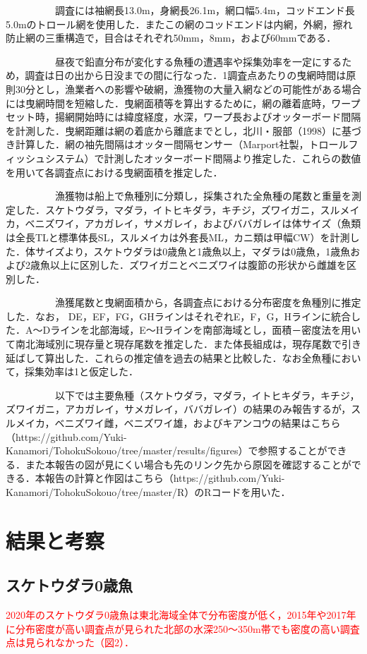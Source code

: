 \documentclass[11pt]{article} %
\begin{document}
\begin{linenumbers}
\ \ \ \ \ \ \ \ \ \ 
調査には袖網長13.0m，身網長26.1m，網口幅5.4m，コッドエンド長5.0mのトロール網を使用した．またこの網のコッドエンドは内網，外網，擦れ防止網の三重構造で，目合はそれぞれ50mm，8mm，および60mmである．

\ \ \ \ \ \ \ \ \ \ 
昼夜で鉛直分布が変化する魚種の遭遇率や採集効率を一定にするため，調査は日の出から日没までの間に行なった．1調査点あたりの曳網時間は原則30分とし，漁業者への影響や破網，漁獲物の大量入網などの可能性がある場合には曳網時間を短縮した．曳網面積等を算出するために，網の離着底時，ワープセット時，揚網開始時には緯度経度，水深，ワープ長およびオッターボード間隔を計測した．曳網距離は網の着底から離底までとし，北川・服部（1998）に基づき計算した．網の袖先間隔はオッター間隔センサー（Marport社製，トロールフィッシュシステム）で計測したオッターボード間隔より推定した．これらの数値を用いて各調査点における曳網面積を推定した．

\ \ \ \ \ \ \ \ \ \ 
漁獲物は船上で魚種別に分類し，採集された全魚種の尾数と重量を測定した．スケトウダラ，マダラ，イトヒキダラ，キチジ，ズワイガニ，スルメイカ，ベニズワイ，アカガレイ，サメガレイ，およびババガレイは体サイズ（魚類は全長TLと標準体長SL，スルメイカは外套長ML，カニ類は甲幅CW）を計測した．体サイズより，スケトウダラは0歳魚と1歳魚以上，マダラは0歳魚，1歳魚および2歳魚以上に区別した．ズワイガニとベニズワイは腹節の形状から雌雄を区別した．

\ \ \ \ \ \ \ \ \ \ 
漁獲尾数と曳網面積から，各調査点における分布密度を魚種別に推定した．なお， DE，EF，FG，GHラインはそれぞれE，F，G，Hラインに統合した．A～Dラインを北部海域，E～Hラインを南部海域とし，面積－密度法を用いて南北海域別に現存量と現存尾数を推定した．また体長組成は，現存尾数で引き延ばして算出した．これらの推定値を過去の結果と比較した．なお全魚種において，採集効率は1と仮定した．

\ \ \ \ \ \ \ \ \ \ 
以下では主要魚種（スケトウダラ，マダラ，イトヒキダラ，キチジ，ズワイガニ，アカガレイ，サメガレイ，ババガレイ）の結果のみ報告するが，スルメイカ，ベニズワイ雌，ベニズワイ雄，およびキアンコウの結果はこちら（https://github.com/Yuki-Kanamori/TohokuSokouo/tree/master/results/figures）で参照することができる．また本報告の図が見にくい場合も先のリンク先から原図を確認することができる．本報告の計算と作図はこちら（https://github.com/Yuki-Kanamori/TohokuSokouo/tree/master/R）のRコードを用いた．

\section{結果と考察}
\subsection{スケトウダラ0歳魚}
\textcolor{red}{2020年のスケトウダラ0歳魚は東北海域全体で分布密度が低く，2015年や2017年に分布密度が高い調査点が見られた北部の水深250～350m帯でも密度の高い調査点は見られなかった（図2）．}


\end{linenumbers}
\end{document}
